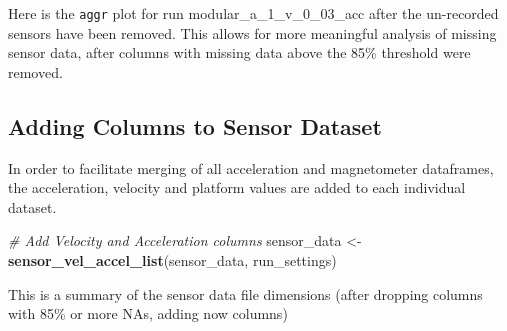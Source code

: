 \documentclass[]{article}
\newenvironment{Shaded}{\begin{snugshade}}{\end{snugshade}}
\newcommand{\CommentTok}[1]{\textcolor[rgb]{0.56,0.35,0.01}{\textit{#1}}}
\newcommand{\KeywordTok}[1]{\textcolor[rgb]{0.13,0.29,0.53}{\textbf{#1}}}
\newcommand{\NormalTok}[1]{#1}
\newcommand{\StringTok}[1]{\textcolor[rgb]{0.31,0.60,0.02}{#1}}
\begin{document}
Here is the \texttt{aggr} plot for run modular\_a\_1\_v\_0\_03\_acc
after the un-recorded sensors have been removed. This allows for more
meaningful analysis of missing sensor data, after columns with missing
data above the 85\% threshold were removed.

\newpage

\hypertarget{adding-columns-to-sensor-dataset}{%
\subsection{Adding Columns to Sensor
Dataset}\label{adding-columns-to-sensor-dataset}}

In order to facilitate merging of all acceleration and magnetometer
dataframes, the acceleration, velocity and platform values are added to
each individual dataset.

\begin{Shaded}
\begin{Highlighting}[]
\CommentTok{# Add Velocity and Acceleration columns}
\NormalTok{sensor_data <-}\StringTok{ }\KeywordTok{sensor_vel_accel_list}\NormalTok{(sensor_data, run_settings)}
\end{Highlighting}
\end{Shaded}

This is a summary of the sensor data file dimensions (after dropping
columns with 85\% or more NAs, adding now columns)
\end{document}
